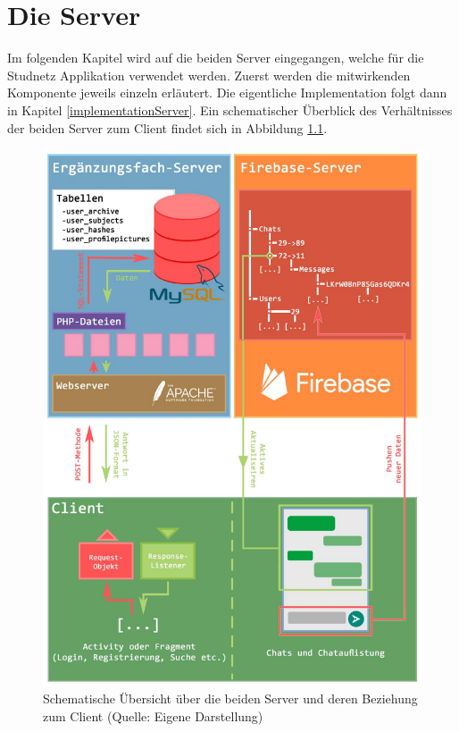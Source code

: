 \documentclass[../main.tex]{subfiles}
\begin{document}
	\chapter{Die Server}
	Im folgenden Kapitel wird auf die beiden Server eingegangen, welche für die Studnetz Applikation verwendet werden. Zuerst werden die mitwirkenden Komponente jeweils einzeln erläutert. Die eigentliche Implementation folgt dann in Kapitel \ref{implementationServer}. Ein schematischer Überblick des Verhältnisses der beiden Server zum Client findet sich in Abbildung \ref{ServerClientSchema}.
	
	\begin{figure} 
		\centering
		\includegraphics[width=\textwidth, height=0.95\textheight]{./images/Scheme-compressed.pdf}
		\caption{Schematische Übersicht über die beiden Server und deren Beziehung zum Client (Quelle: Eigene Darstellung)}
		\label{ServerClientSchema}
	\end{figure}
	
\end{document}
